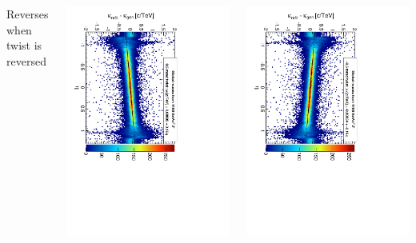 \documentclass[compress]{beamer}
\begin{document}
\begin{frame}
\begin{columns}
Reverses when twist is reversed

\includegraphics[height=\linewidth, angle=90]{curvbias_vseta_twist0_5mrad_1100_GlobalMuons2.pdf}

\includegraphics[height=\linewidth, angle=90]{curvbias_vseta_antitwist0_5mrad_1100_GlobalMuons2.pdf}
\end{columns}
\end{frame}
\end{document}
